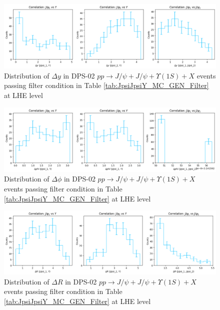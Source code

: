 \documentclass[10pt,twocolumn]{article}
\begin{document}
\begin{figure}
    \centering
    \includegraphics[width=1.0\linewidth]{images/LHE_LEVEL_DPS_JJ_Y1S_DeltaY_filtered.png}
    \caption{Distribution of $\Delta y$ in DPS-02 $pp\to J/\psi+J/\psi+\Upsilon(1S)+X$ events passing filter condition in Table \ref{tab:JpsiJpsiY_MC_GEN_Filter} at LHE level}
    \label{fig:DPS02_JJY1S_filtered_DeltaY_LHE}
\end{figure}

\begin{figure}
    \centering
    \includegraphics[width=1.0\linewidth]{images/LHE_LEVEL_DPS_JJ_Y1S_DeltaPhi_filtered.png}
    \caption{Distribution of $\Delta \phi$ in DPS-02 $pp\to J/\psi+J/\psi+\Upsilon(1S)+X$ events passing filter condition in Table \ref{tab:JpsiJpsiY_MC_GEN_Filter} at LHE level}
    \label{fig:DPS02_JJY1S_filtered_DeltaPhi_LHE}
\end{figure}

\begin{figure}
    \centering
    \includegraphics[width=1.0\linewidth]{images/LHE_LEVEL_DPS_JJ_Y1S_DeltaR_filtered.png}
    \caption{Distribution of $\Delta R$ in DPS-02 $pp\to J/\psi+J/\psi+\Upsilon(1S)+X$ events passing filter condition in Table \ref{tab:JpsiJpsiY_MC_GEN_Filter} at LHE level}
    \label{fig:DPS02_JJY1S_filtered_DeltaR_LHE}
\end{figure}
\end{document}
